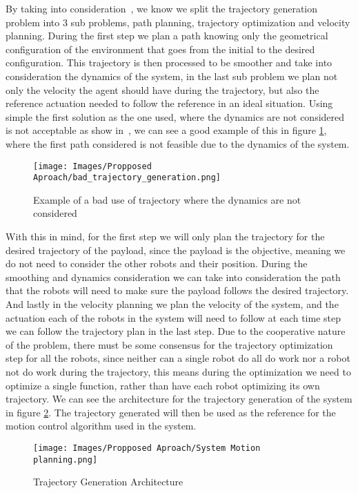 By taking into consideration~\cite{lavalle2006planning}, we know we split the trajectory generation problem into 3 sub problems, path planning, trajectory optimization and velocity planning. During the first step we plan a path knowing only the geometrical configuration of the environment that goes from the initial to the desired configuration. This trajectory is then processed to be smoother and take into consideration the dynamics of the system, in the last sub problem we plan not only the velocity the agent should have during the trajectory, but also the reference actuation needed to follow the reference in an ideal situation. Using simple the first solution as the one used, where the dynamics are not considered is not acceptable as show in~\cite{bergman2021exploiting}, we can see a good example of this in figure \ref{eq: Proposed Approach: Space Cobot: Bad trajectory generation}, where the first path considered is not feasible due to the dynamics of the system.

\begin{figure}
    \centering
    \texttt{[image: Images/Propposed Aproach/bad\_trajectory\_generation.png]}
    \caption{Example of a bad use of trajectory where the dynamics are not considered}
    \label{eq: Proposed Approach: Space Cobot: Bad trajectory generation}
\end{figure}

With this in mind, for the first step we will only plan the trajectory for the desired trajectory of the payload, since the payload is the objective, meaning we do not need to consider the other robots and their position. During the smoothing and dynamics consideration we can take into consideration the path that the robots will need to make sure the payload follows the desired trajectory. And lastly in the velocity planning we plan the velocity of the system, and the actuation each of the robots in the system will need to follow at each time step we can follow the trajectory plan in the last step. Due to the cooperative nature of the problem, there must be some consensus for the trajectory optimization step for all the robots, since neither can a single robot do all do work nor a robot not do work during the trajectory, this means during the optimization we need to optimize a single function, rather than have each robot optimizing its own trajectory. We can see the architecture for the trajectory generation of the system in figure \ref{fig:Proposed Approach: Trajectory Generation: Architecture}. The trajectory generated will then be used as the reference for the motion control algorithm used in the system.


\begin{figure}[H]
    \centering
    \texttt{[image: Images/Propposed Aproach/System Motion planning.png]}
    \caption{Trajectory Generation Architecture}
    \label{fig:Proposed Approach: Trajectory Generation: Architecture}
\end{figure}


